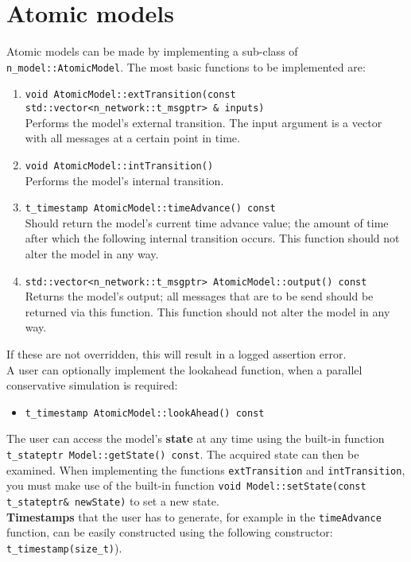 \section{Atomic models}
Atomic models can be made by implementing a sub-class of \texttt{n\_model::AtomicModel}. The most basic functions to be implemented are:
\begin{enumerate}
	\item \texttt{void AtomicModel::extTransition(const std::vector{\textless}n\_network::t\_msgptr{\textgreater} \& inputs)}\\
		Performs the model's external transition. The input argument is a vector with all messages at a certain point in time.
	\item \texttt{void AtomicModel::intTransition()}\\
		Performs the model's internal transition. 
	\item \texttt{t\_timestamp AtomicModel::timeAdvance() const}\\
		Should return the model's current time advance value; the amount of time after which the following internal transition occurs. This function should not alter the model in any way.
	\item \texttt{std::vector{\textless}n\_network::t\_msgptr{\textgreater} AtomicModel::output()  const}\\
		Returns the model's output; all messages that are to be send should be returned via this function. This function should not alter the model in any way.
\end{enumerate}
If these are not overridden, this will result in a logged assertion error.\\
A user can optionally implement the lookahead function, when a parallel conservative simulation is required:
\begin{itemize}
	\item \texttt{t\_timestamp AtomicModel::lookAhead() const}
\end{itemize}

The user can access the model's \textbf{state} at any time using the built-in function \texttt{t\_stateptr Model::getState() const}. The acquired state can then be examined. When implementing the functions \texttt{extTransition} and \texttt{intTransition}, you must make use of the built-in function \texttt{void Model::setState(const t\_stateptr\& newState)} to set a new state.\\

\textbf{Timestamps} that the user has to generate, for example in the \texttt{timeAdvance} function, can be easily constructed using the following constructor:\\ \texttt{t\_timestamp(size\_t)}).\\

